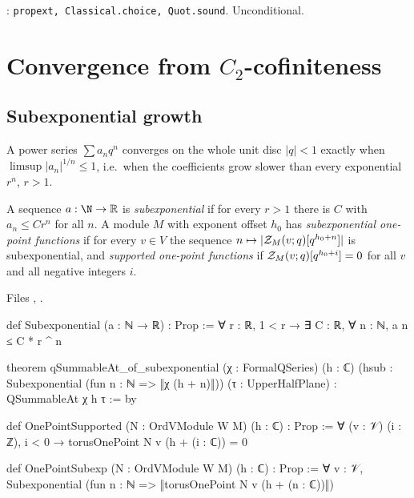 \begin{status}
\allowbreak{}: \texttt{propext, Classical.choice, Quot.sound}. Unconditional.
\end{status}

\section{Convergence from \texorpdfstring{$C_2$}{C2}-cofiniteness}\label{l15:sec:convergence}

\subsection{Subexponential growth}

A power series $\sum a_nq^n$ converges on the whole unit disc $|q|<1$ exactly when $\limsup|a_n|^{1/n}\le1$, i.e.\ when
the coefficients grow slower than every exponential $r^n$, $r>1$.

\begin{definition}\label{l15:def:subexp}
A sequence $a:\N\to\mathbb{R}$ is \emph{subexponential} if for every $r>1$ there is $C$ with $a_n\le Cr^n$ for all $n$. A module
$M$ with exponent offset $h_0$ has \emph{subexponential one-point functions} if for every $v\in V$ the sequence
$n\mapsto|\mathcal{Z}_M(v;q)[q^{h_0+n}]|$ is subexponential, and \emph{supported one-point functions} if
$\mathcal{Z}_M(v;q)[q^{h_0+i}]=0$ for all $v$ and all negative integers $i$.
\end{definition}
\noindent Files ,
.
\begin{leancode}
def Subexponential (a : ℕ → ℝ) : Prop :=
  ∀ r : ℝ, 1 < r → ∃ C : ℝ, ∀ n : ℕ, a n ≤ C * r ^ n

theorem qSummableAt_of_subexponential (χ : FormalQSeries) (h : ℂ)
    (hsub : Subexponential (fun n : ℕ => ‖χ (h + n)‖)) (τ : UpperHalfPlane) :
    QSummableAt χ h τ := by

def OnePointSupported (N : OrdVModule W M) (h : ℂ) : Prop :=
  ∀ (v : 𝒱) (i : ℤ), i < 0 → torusOnePoint N v (h + (i : ℂ)) = 0

def OnePointSubexp (N : OrdVModule W M) (h : ℂ) : Prop :=
  ∀ v : 𝒱, Subexponential (fun n : ℕ => ‖torusOnePoint N v (h + (n : ℂ))‖)
\end{leancode}

